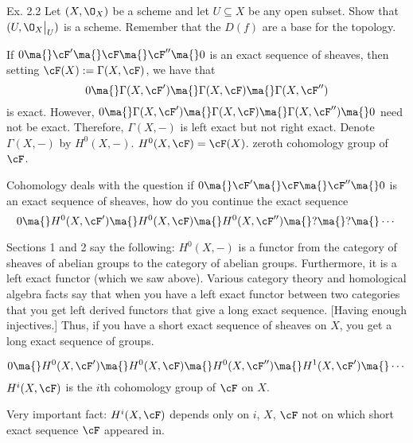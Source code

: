 \begin{ex} Ex. 2.2
Let $(X, \O_X)$ be a scheme and let $U \subseteq X$ be any open subset. Show that $(U, \O_X \big|_U)$ is a scheme. Remember that the $D(f)$ are a base for the topology. 
\end{ex}






If $0 \ma{} \cF' \ma{} \cF \ma{} \cF'' \ma{} 0$ is an exact sequence of sheaves, then setting $\cF(X):= \Gamma(X,\cF)$, we have that 
	\[
	0 \ma{} \Gamma(X,\cF') \ma{} \Gamma(X,\cF) \ma{} \Gamma(X,\cF'')
	\]
is exact. However, $0 \ma{} \Gamma(X,\cF') \ma{} \Gamma(X,\cF) \ma{} \Gamma(X,\cF'') \ma{} 0$ need not be exact. Therefore, $\Gamma(X, -)$ is left exact but not right exact. Denote $\Gamma(X,-)$ by $H^0(X,-)$. $H^0(X,\cF)= \cF(X)$. zeroth cohomology group of $\cF$.


Cohomology deals with the question if $0 \ma{} \cF' \ma{} \cF \ma{} \cF'' \ma{} 0$ is an exact sequence of sheaves, how do you continue the exact sequence
	\[
	0 \ma{} H^0(X,\cF') \ma{} H^0(X,\cF) \ma{} H^0(X,\cF'') \ma{} ? \ma{} ? \ma{} \cdots
	\]

Sections 1 and 2 say the following: $H^0(X,-)$ is a functor from the category of sheaves of abelian groups to the category of abelian groups. Furthermore, it is a left exact functor (which we saw above). Various category theory and homological algebra facts say that when you have a left exact functor between two categories that you get left derived functors that give a long exact sequence. [Having enough injectives.] Thus, if you have a short exact sequence of sheaves on $X$, you get a long exact sequence of groups. 

	\[
	0 \ma{} H^0(X,\cF') \ma{} H^0(X,\cF) \ma{} H^0(X,\cF'') \ma{} H^1(X,\cF') \ma{} \cdots
	\] %
$H^i(X,\cF)$ is the $i$th cohomology group of $\cF$ on $X$.

Very important fact: $H^i(X,\cF)$ depends only on $i$, $X$, $\cF$ not on which short exact sequence $\cF$ appeared in.




